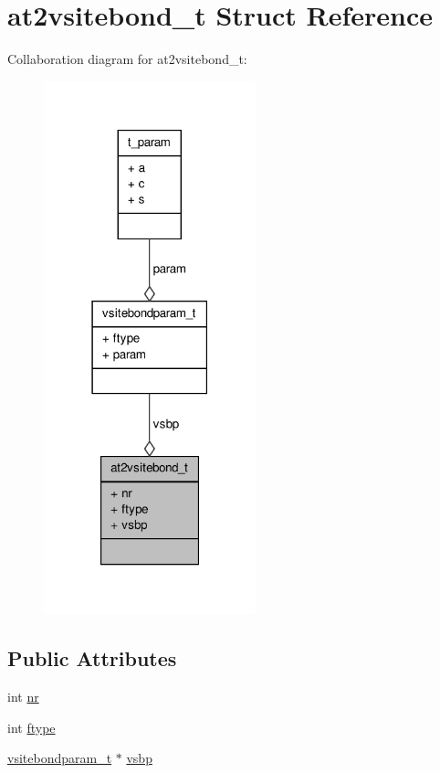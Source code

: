 \hypertarget{structat2vsitebond__t}{\section{at2vsitebond\-\_\-t \-Struct \-Reference}
\label{structat2vsitebond__t}
}


\-Collaboration diagram for at2vsitebond\-\_\-t\-:
\nopagebreak
\begin{figure}[H]
\begin{center}
\leavevmode
\includegraphics[width=174pt]{structat2vsitebond__t__coll__graph}
\end{center}
\end{figure}
\subsection*{\-Public \-Attributes}
\begin{DoxyCompactItemize}
\item 
int \hyperlink{structat2vsitebond__t_ac8170f544d44f22e187bb0eac1d53c1a}{nr}
\item 
int \hyperlink{structat2vsitebond__t_a1d5c356dbac65dc8c50e7c7c8a98f573}{ftype}
\item 
\hyperlink{structvsitebondparam__t}{vsitebondparam\-\_\-t} $\ast$ \hyperlink{structat2vsitebond__t_adab970e43ee2e76dc29065414a92ff03}{vsbp}
\end{DoxyCompactItemize}


